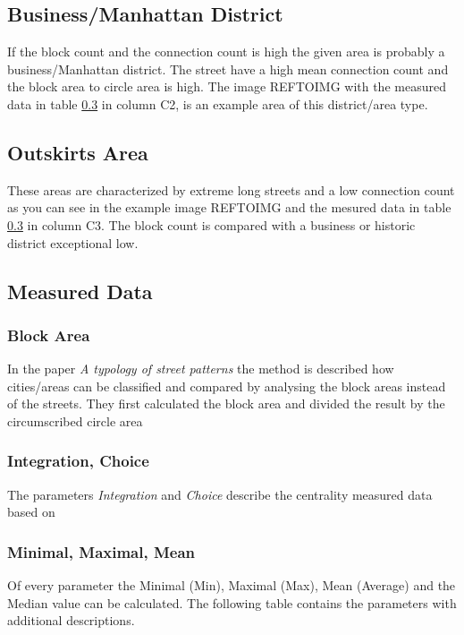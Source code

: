 \documentclass[11pt, a4paper]{report}
\begin{document}
\subsection{Business/Manhattan District}
\label{sec:businessDistinct}
If the block count and the connection count is high the given area is probably a business/Manhattan district. The street have a high mean connection count and the block area to circle area is high. The image REFTOIMG with the measured data in table \ref{sec:ClusterAnalysisMeasurements} in column C2, is an example area of this district/area type.

\subsection{Outskirts Area}
\label{sec:outskits}
These areas are characterized by extreme long streets and a low connection count as you can see in the example image REFTOIMG and the mesured data in table \ref{sec:ClusterAnalysisMeasurements} in column C3. The block count is compared with a business or historic district exceptional low.

\subsection{Measured Data}
\label{sec:ClusterAnalysisMeasurements}

\subsubsection{Block Area}
In the paper \textit{A typology of street patterns}\citep{blockArea:2014} the method is described how cities/areas can be classified and compared by analysing the block areas instead of the streets. 
They first calculated the block area and divided the result by the circumscribed circle area 

\subsubsection{Integration, Choice}
The parameters \textit{Integration} and \textit{Choice} describe the centrality measured data based on

\subsubsection{Minimal, Maximal, Mean}
Of every parameter the Minimal (Min), Maximal (Max), Mean (Average) and the Median value can be calculated. The following table contains the parameters with additional descriptions.
\end{document}
